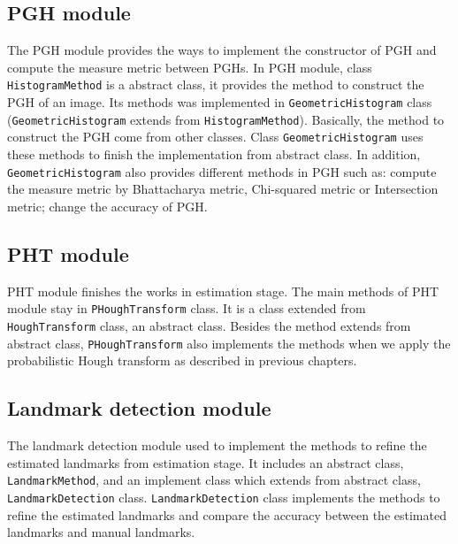 \subsection{PGH module}
The PGH module provides the ways to implement the constructor of PGH and compute the measure metric between PGHs. In PGH module, class \texttt{HistogramMethod} is a abstract class, it provides the method to construct the PGH of an image. Its methods was implemented in \texttt{GeometricHistogram} class (\texttt{GeometricHistogram} extends from \texttt{HistogramMethod}). Basically, the method to construct the PGH come from other classes. Class \texttt{GeometricHistogram} uses these methods to finish the implementation from abstract class. In addition, \texttt{GeometricHistogram} also provides different methods in PGH such as: compute the measure metric by Bhattacharya metric, Chi-squared metric or Intersection metric; change the accuracy of PGH.
\subsection{PHT module}
PHT module finishes the works in estimation stage. The main methods of PHT module stay in \texttt{PHoughTransform} class. It is a class extended from \texttt{HoughTransform} class, an abstract class. Besides the method extends from abstract class, \texttt{PHoughTransform} also implements the methods when we apply the probabilistic Hough transform as described in previous chapters.
\subsection{Landmark detection module}
The landmark detection module used to implement the methods to refine the estimated landmarks from estimation stage. It includes an abstract class, \texttt{LandmarkMethod}, and an implement class which extends from abstract class, \texttt{LandmarkDetection} class. \texttt{LandmarkDetection} class implements the methods to refine the estimated landmarks and compare the accuracy between the estimated landmarks and manual landmarks.
